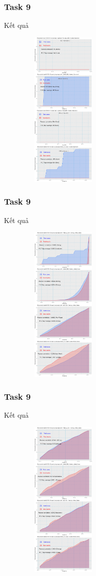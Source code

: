 \documentclass[english,10pt,table]{beamer}
\begin{document}
\frame
{
    \frametitle{Task 9}
    \begin{block}{Kết quả}
	\begin{figure}[H]
		\centering
		\includegraphics[height=7.7cm,width=4.2cm]{images/9.4.png}
	\end{figure}
    \end{block}
}
\frame
{
    \frametitle{Task 9}
    \begin{block}{Kết quả}
	\begin{figure}[H]
		\centering
		\includegraphics[height=7.7cm,width=4.2cm]{images/9.5.png}
	\end{figure}
    \end{block}
}
\frame
{
    \frametitle{Task 9}
    \begin{block}{Kết quả}
	\begin{figure}[H]
		\centering
		\includegraphics[height=7.7cm,width=4.2cm]{images/9.6.png}
	\end{figure}
    \end{block}
}
\end{document}
